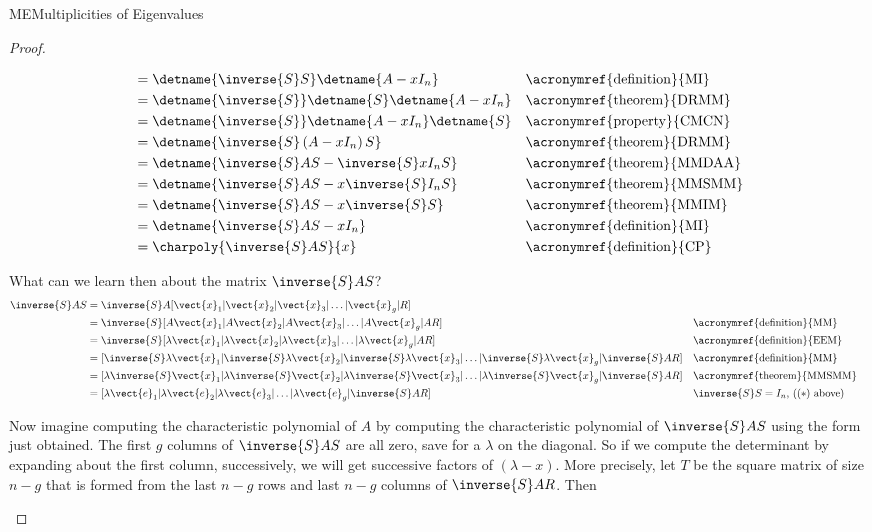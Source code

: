 \begin{subsect}{ME}{Multiplicities of Eigenvalues}
\begin{proof}
\begin{para}
\begin{align*}
&=\detname{\inverse{S}S}\detname{A-xI_n}&&\text{\acronymref{definition}{MI}}\\
&=\detname{\inverse{S}}\detname{S}\detname{A-xI_n}&&\text{\acronymref{theorem}{DRMM}}\\
&=\detname{\inverse{S}}\detname{A-xI_n}\detname{S}&&\text{\acronymref{property}{CMCN}}\\
&=\detname{\inverse{S}\left(A-xI_n\right)S}&&\text{\acronymref{theorem}{DRMM}}\\
&=\detname{\inverse{S}AS-\inverse{S}xI_nS}&&\text{\acronymref{theorem}{MMDAA}}\\
&=\detname{\inverse{S}AS-x\inverse{S}I_nS}&&\text{\acronymref{theorem}{MMSMM}}\\
&=\detname{\inverse{S}AS-x\inverse{S}S}&&\text{\acronymref{theorem}{MMIM}}\\
&=\detname{\inverse{S}AS-xI_n}&&\text{\acronymref{definition}{MI}}\\
&=\charpoly{\inverse{S}AS}{x}&&\text{\acronymref{definition}{CP}}
\end{align*}
\end{para}
%
\begin{para}What can we learn then about the matrix $\inverse{S}AS$?
%
\begin{align*}
\inverse{S}AS&=\inverse{S}A[\vect{x}_1|\vect{x}_2|\vect{x}_3|\ldots|\vect{x}_g|R]\\
&=\inverse{S}[A\vect{x}_1|A\vect{x}_2|A\vect{x}_3|\ldots|A\vect{x}_g|AR]&&\text{\acronymref{definition}{MM}}\\
&=\inverse{S}[\lambda\vect{x}_1|\lambda\vect{x}_2|\lambda\vect{x}_3|\ldots|\lambda\vect{x}_g|AR]&&\text{\acronymref{definition}{EEM}}\\
&=[\inverse{S}\lambda\vect{x}_1|\inverse{S}\lambda\vect{x}_2|\inverse{S}\lambda\vect{x}_3|\ldots|\inverse{S}\lambda\vect{x}_g|\inverse{S}AR]&&\text{\acronymref{definition}{MM}}\\
&=[\lambda\inverse{S}\vect{x}_1|\lambda\inverse{S}\vect{x}_2|\lambda\inverse{S}\vect{x}_3|\ldots|\lambda\inverse{S}\vect{x}_g|\inverse{S}AR]&&\text{\acronymref{theorem}{MMSMM}}\\
&=[\lambda\vect{e}_1|\lambda\vect{e}_2|\lambda\vect{e}_3|\ldots|\lambda\vect{e}_g|\inverse{S}AR]&&\text{$\inverse{S}S=I_n$, (($*$) above)}
\end{align*}
\end{para}
%
\begin{para}Now imagine computing the characteristic polynomial of $A$ by computing the characteristic polynomial of $\inverse{S}AS$ using the form just obtained.  The first $g$ columns of $\inverse{S}AS$ are all zero, save for a $\lambda$ on the diagonal.  So if we compute the determinant by expanding about the first column, successively, we will get successive factors of $(\lambda-x)$.  More precisely, let $T$ be the square matrix of size $n-g$ that is formed from the last $n-g$ rows and last $n-g$ columns of $\inverse{S}AR$.  Then

\end{para}
\end{proof}
\end{subsect}
